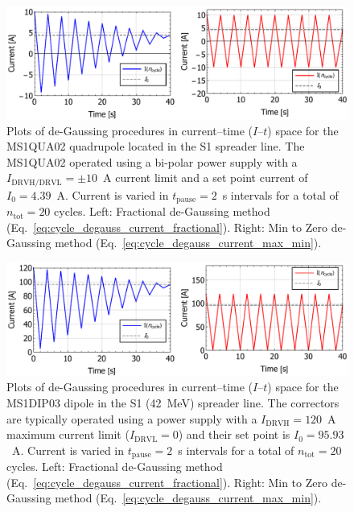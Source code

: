 \documentclass[../main.tex]{subfiles}
\begin{document}
\begin{figure}[!h]
\centering
\includegraphics[width=\textwidth]{Figures/CBETA_Multi-Pass_Commissioning/degauss/degauss_current_time_MS1QUA02.pdf}
\caption{Plots of de-Gaussing procedures in current--time ($I$--$t$) space for the MS1QUA02 quadrupole located in the S1 spreader line. The MS1QUA02 operated using a bi-polar power supply with a $I_{\mathrm{DRVH/DRVL}}=\pm10$~\si{\ampere} current limit and a set point current of $I_{0}=4.39$~\si{\ampere}. Current is varied in $t_{\mathrm{pause}}=2$~\si{\second} intervals for a total of $n_{\mathrm{tot}}=20$ cycles. Left: Fractional de-Gaussing method (Eq.~\ref{eq:cycle_degauss_current_fractional}). Right: Min to Zero de-Gaussing method (Eq.~\ref{eq:cycle_degauss_current_max_min}).}
\label{fig:MS1QUA02_degauss_procedure}
\end{figure}

\begin{figure}[!h]
\centering
\includegraphics[width=\textwidth]{Figures/CBETA_Multi-Pass_Commissioning/degauss/degauss_current_time_MS1DIP03.pdf}
\caption{Plots of de-Gaussing procedures in current--time ($I$--$t$) space for the MS1DIP03 dipole in the S1 (42~\si{\mega\electronvolt}) spreader line. The correctors are typically operated using a power supply with a $I_{\mathrm{DRVH}}=120$~\si{\ampere} maximum current limit ($I_{\mathrm{DRVL}}=0$) and their set point is $I_{0}=95.93$~\si{\ampere}. Current is varied in $t_{\mathrm{pause}}=2$~\si{\second} intervals for a total of $n_{\mathrm{tot}}=20$ cycles. Left: Fractional de-Gaussing method (Eq.~\ref{eq:cycle_degauss_current_fractional}). Right: Min to Zero de-Gaussing method (Eq.~\ref{eq:cycle_degauss_current_max_min}).}
\label{fig:MS1DIP03_degauss_procedure}
\end{figure}
\end{document}
